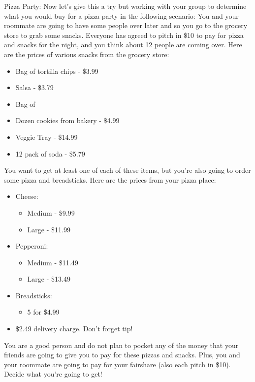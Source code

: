 \documentclass{ximera}
\begin{document}
\begin{exploration}  Pizza Party: 
Now let's give this a try but working with your group to determine what you would buy for a pizza party in the following scenario: 
You and your roommate are going to have some people over later and so you go to the grocery store to grab some snacks.  Everyone has agreed to pitch in \$10 to pay for pizza and snacks for the night, and you think about 12 people are coming over.  Here are the prices of various snacks from the grocery store: 
\begin{itemize}
\item Bag of tortilla chips - \$3.99 
\item Salsa - \$3.79
\item Bag of %
\item Dozen cookies from bakery - \$4.99 
\item Veggie Tray - \$14.99 
\item 12 pack of soda - \$5.79 
\end{itemize}
You want to get at least one of each of these items, but you're also going to order some pizza and breadsticks. 
Here are the prices from your pizza place: 
\begin{itemize}
    \item Cheese: 
    \begin{itemize}
        \item Medium - \$9.99 
        \item Large - \$11.99 
    \end{itemize}
    \item Pepperoni: 
    \begin{itemize}
        \item Medium - \$11.49 
        \item Large - \$13.49 
    \end{itemize}
    \item Breadsticks: 
    \begin{itemize}
        \item 5 for \$4.99 
    \end{itemize}
    \item \$2.49 delivery charge.  Don't forget tip! 
\end{itemize}


You are a good person and do not plan to pocket any of the money that your friends are going to give you to pay for these pizzas and snacks.  Plus, you and your roommate are going to pay for your fairshare (also each pitch in \$10).  Decide what you're going to get! 
\end{exploration}
\end{document}
